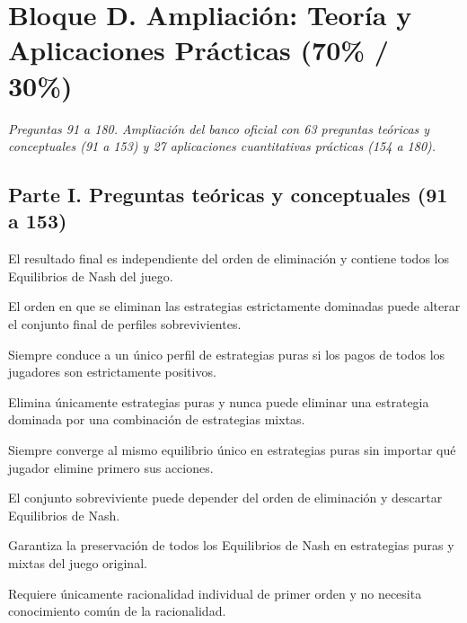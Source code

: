 \section*{Bloque D. Ampliación: Teoría y Aplicaciones Prácticas (70\% / 30\%)}

\noindent\textit{Preguntas 91 a 180. Ampliación del banco oficial con 63 preguntas teóricas y conceptuales (91 a 153) y 27 aplicaciones cuantitativas prácticas (154 a 180).}

\subsection*{Parte I. Preguntas teóricas y conceptuales (91 a 153)}

\begin{opts}
    \item El resultado final es independiente del orden de eliminación y contiene todos los Equilibrios de Nash del juego.
    \item El orden en que se eliminan las estrategias estrictamente dominadas puede alterar el conjunto final de perfiles sobrevivientes.
    \item Siempre conduce a un único perfil de estrategias puras si los pagos de todos los jugadores son estrictamente positivos.
    \item Elimina únicamente estrategias puras y nunca puede eliminar una estrategia dominada por una combinación de estrategias mixtas.
\end{opts}

\begin{opts}
    \item Siempre converge al mismo equilibrio único en estrategias puras sin importar qué jugador elimine primero sus acciones.
    \item El conjunto sobreviviente puede depender del orden de eliminación y descartar Equilibrios de Nash.
    \item Garantiza la preservación de todos los Equilibrios de Nash en estrategias puras y mixtas del juego original.
    \item Requiere únicamente racionalidad individual de primer orden y no necesita conocimiento común de la racionalidad.
\end{opts}


